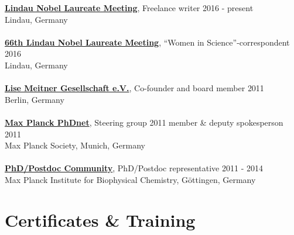 \documentclass[margin,line]{res}
\begin{document}
\begin{resume}
{\bf \href{https://www.lindau-nobel.org/blog-women-in-research-at-lino70/}{Lindau Nobel Laureate Meeting}}, Freelance writer \hfill {2016 - present}\\
Lindau, Germany\\
\vspace*{-3mm}\\
{\bf \href{https://www.br.de/fernsehen/ard-alpha/sendungen/alpha-forum/alpha-forum-extra-spitzenforschung-102.html}{66th Lindau Nobel Laureate Meeting}}, “Women in Science”-correspondent \hfill {2016}\\
Lindau, Germany\\
\vspace*{-3mm}\\
{\bf \href{https://www.lise-meitner-gesellschaft.org/}{Lise Meitner Gesellschaft e.V.}}, Co-founder and board member \hfill {2011}\\
Berlin, Germany\\
\vspace*{-3mm}\\
{\bf \href{https://www.phdnet.mpg.de/home}{Max Planck PhDnet}}, Steering group 2011 member \& deputy spokesperson \hfill {2011}\\
Max Planck Society, Munich, Germany\\
\vspace*{-3mm}\\
{\bf  \href{https://www.mpibpc.mpg.de/phdcom}{PhD/Postdoc Community}}, PhD/Postdoc representative \hfill {2011 - 2014}\\
Max Planck Institute for Biophysical Chemistry, Göttingen, Germany\\


\section{\sc Certificates \& Training}

%


\end{resume}
\end{document}
